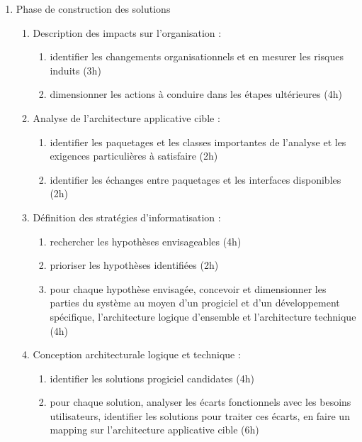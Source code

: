 \begin{enumerate}
    \item Phase de construction des solutions

          \begin{enumerate}
            \item Description des impacts sur l'organisation : 
                \begin{enumerate}
                  \item identifier les changements organisationnels et en mesurer les risques induits (3h)
                  \item dimensionner les actions à conduire dans les étapes ultérieures (4h)
                \end{enumerate}
            \item Analyse de l'architecture applicative cible : 
                \begin{enumerate}
                  \item identifier les paquetages et les classes importantes de l'analyse et les exigences particulières à satisfaire (2h)
                  \item identifier les échanges entre paquetages et les interfaces disponibles (2h)
                \end{enumerate}
            \item Définition des stratégies d'informatisation : 
                \begin{enumerate}
                  \item rechercher les hypothèses envisageables (4h)
                  \item prioriser les hypothèses identifiées (2h)
                  \item pour chaque hypothèse envisagée, concevoir et dimensionner les parties du système au moyen d'un progiciel et d'un développement spécifique, l'architecture logique d'ensemble et l'architecture technique (4h)
                \end{enumerate}
            \item Conception architecturale logique et technique : 
                \begin{enumerate}
                  \item identifier les solutions progiciel candidates (4h)
                  \item pour chaque solution, analyser les écarts fonctionnels avec les besoins utilisateurs, identifier les solutions pour traiter ces écarts, en faire un mapping sur l'architecture applicative cible (6h)
                \end{enumerate}

\end{enumerate}
\end{enumerate}
